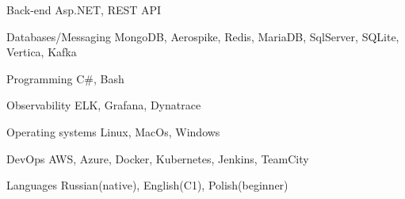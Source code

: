 

\begin{cvskills}

  \cvskill
    {Back-end} %
    {Asp.NET, REST API} %

  \cvskill
    {Databases/Messaging} %
    {MongoDB, Aerospike, Redis, MariaDB, SqlServer, SQLite, Vertica, Kafka} %

  \cvskill
    {Programming} %
    {C\#, Bash} %

  \cvskill
    {Observability} %
    {ELK, Grafana, Dynatrace} %

  \cvskill
    {Operating systems} %
    {Linux, MacOs, Windows} %

  \cvskill
    {DevOps} %
    {AWS, Azure, Docker, Kubernetes, Jenkins, TeamCity} %

  \cvskill
    {Languages} %
    {Russian(native), English(C1), Polish(beginner)} %

\end{cvskills}
